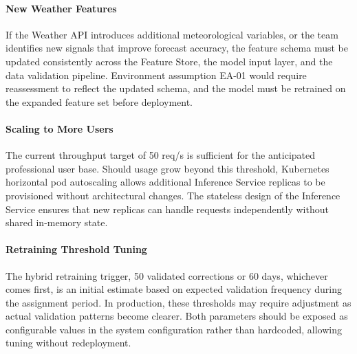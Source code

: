 \documentclass[12pt, a4paper]{report}
\begin{document}
\paragraph{New Weather Features}
If the Weather API introduces additional meteorological variables, or the team identifies new signals that improve forecast accuracy, the feature schema must be updated consistently across the Feature Store, the model input layer, and the data validation pipeline. Environment assumption EA-01 would require reassessment to reflect the updated schema, and the model must be retrained on the expanded feature 
set before deployment.


\paragraph{Scaling to More Users}
The current throughput target of 50 req/s is sufficient for the anticipated professional user base. Should usage grow beyond this threshold, Kubernetes horizontal pod autoscaling allows additional Inference Service replicas to be provisioned without architectural changes. The stateless design of the Inference Service ensures that new replicas can handle requests independently without shared in-memory state.

\paragraph{Retraining Threshold Tuning}
The hybrid retraining trigger, 50 validated corrections or 60 days, whichever comes first, is an initial estimate based on expected validation frequency during the assignment period. In production, these thresholds may require adjustment as actual validation patterns become clearer. Both parameters should be exposed as configurable values in the system configuration rather than hardcoded, allowing tuning without redeployment.
\end{document}
